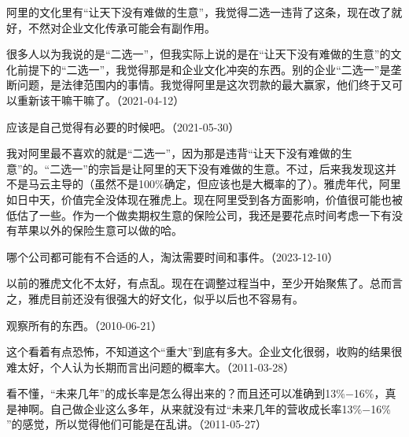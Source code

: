 阿里的文化里有“让天下没有难做的生意”，我觉得二选一违背了这条，现在改了就好，不然对企业文化传承可能会有副作用。

很多人以为我说的是“二选一”，但我实际上说的是在“让天下没有难做的生意”的文化前提下的“二选一”，我觉得那是和企业文化冲突的东西。别的企业“二选一”是垄断问题，是法律范围内的事情。我觉得阿里是这次罚款的最大赢家，他们终于又可以重新该干嘛干嘛了。（2021-04-12）


应该是自己觉得有必要的时候吧。（2021-05-30）


我对阿里最不喜欢的就是“二选一”，因为那是违背“让天下没有难做的生意”的。“二选一”的宗旨是让阿里的天下没有难做的生意。不过，后来我发现这并不是马云主导的（虽然不是100\%确定，但应该也是大概率的了）。雅虎年代，阿里如日中天，价值完全没体现在雅虎上。现在阿里受到各方面影响，价值很可能也被低估了一些。作为一个做卖期权生意的保险公司，我还是要花点时间考虑一下有没有苹果以外的保险生意可以做的哈。


哪个公司都可能有不合适的人，淘汰需要时间和事件。（2023-12-10）


以前的雅虎文化不太好，有点乱。现在在调整过程当中，至少开始聚焦了。总而言之，雅虎目前还没有很强大的好文化，似乎以后也不容易有。


观察所有的东西。（2010-06-21）


这个看着有点恐怖，不知道这个“重大”到底有多大。企业文化很弱，收购的结果很难太好，个人认为长期而言出问题的概率大。（2011-03-28）


看不懂，“未来几年”的成长率是怎么得出来的？而且还可以准确到13\%\( - \)16\%，真是神啊。自己做企业这么多年，从来就没有过“未来几年的营收成长率13\%\( - \)16\% ”的感觉，所以觉得他们可能是在乱讲。（2011-05-27）


